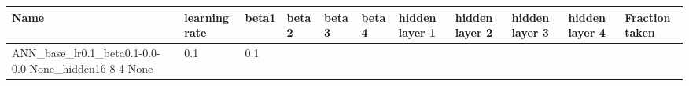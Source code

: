 \documentclass[11pt, a4paper , landscape]{article}
\begin{document}
\begin{longtable}[]{@{}lllllllllll@{}}
\toprule
\begin{minipage}[b]{0.04\columnwidth}\raggedright\strut
Name\strut
\end{minipage} & \begin{minipage}[b]{0.09\columnwidth}\raggedright\strut
learning rate\strut
\end{minipage} & \begin{minipage}[b]{0.04\columnwidth}\raggedright\strut
beta1\strut
\end{minipage} & \begin{minipage}[b]{0.05\columnwidth}\raggedright\strut
beta 2\strut
\end{minipage} & \begin{minipage}[b]{0.05\columnwidth}\raggedright\strut
beta 3\strut
\end{minipage} & \begin{minipage}[b]{0.05\columnwidth}\raggedright\strut
beta 4\strut
\end{minipage} & \begin{minipage}[b]{0.09\columnwidth}\raggedright\strut
hidden layer 1\strut
\end{minipage} & \begin{minipage}[b]{0.09\columnwidth}\raggedright\strut
hidden layer 2\strut
\end{minipage} & \begin{minipage}[b]{0.09\columnwidth}\raggedright\strut
hidden layer 3\strut
\end{minipage} & \begin{minipage}[b]{0.10\columnwidth}\raggedright\strut
hidden layer 4\strut
\end{minipage} & \begin{minipage}[b]{0.04\columnwidth}\raggedright\strut
Fraction taken\strut
\end{minipage}\tabularnewline
\midrule
\endhead
\begin{minipage}[t]{0.04\columnwidth}\raggedright\strut
ANN\_base\_lr0.1\_beta0.1-0.0-0.0-None\_hidden16-8-4-None\strut
\end{minipage} & \begin{minipage}[t]{0.09\columnwidth}\raggedright\strut
0.1\strut
\end{minipage} & \begin{minipage}[t]{0.04\columnwidth}\raggedright\strut
0.1\strut
\end{minipage} & \begin{minipage}[t]{0.05\columnwidth}\raggedright\strut

\end{minipage}
\end{longtable}
\end{document}
